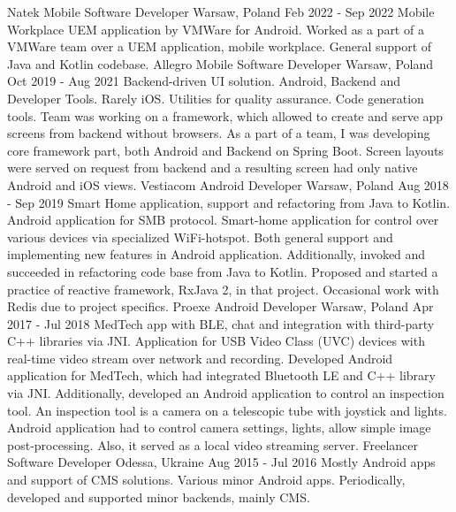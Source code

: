 
\cvexperience
  {Natek}
  {Mobile Software Developer}
  {Warsaw, Poland}
  {Feb 2022 - Sep 2022}
  {
    Mobile Workplace UEM application by VMWare for Android.
  }
  {
    Worked as a part of a VMWare team over a UEM application, mobile workplace. General support of Java and Kotlin codebase.
  }
\cvexperience
  {Allegro}
  {Mobile Software Developer}
  {Warsaw, Poland}
  {Oct 2019 - Aug 2021}
  {
    Backend-driven UI solution. Android, Backend and Developer Tools. Rarely iOS.
    \newline
    Utilities for quality assurance. Code generation tools.
  }
  {
    Team was working on a framework, which allowed to create and serve app screens from backend without browsers.
    \newline
    As a part of a team, I was developing core framework part, both Android and Backend on Spring Boot.
    \newline
    Screen layouts were served on request from backend and a resulting screen had only native Android and iOS views.      
  }
\cvexperience
  {Vestiacom}
  {Android Developer}
  {Warsaw, Poland}
  {Aug 2018 - Sep 2019}
  {
    Smart Home application, support and refactoring from Java to Kotlin.
    \newline
    Android application for SMB protocol.
  }
  {
    Smart-home application for control over various devices via specialized WiFi-hotspot.
    Both general support and implementing new features in Android application.
    Additionally, invoked and succeeded in refactoring code base from Java to Kotlin.
    \newline
    Proposed and started a practice of reactive framework, RxJava 2, in that project.
    Occasional work with Redis due to project specifics.
  }
\cvexperience
  {Proexe}
  {Android Developer}
  {Warsaw, Poland}
  {Apr 2017 - Jul 2018}
  {
    MedTech app with BLE, chat and integration with third-party C++ libraries via JNI.
    \newline
    Application for USB Video Class (UVC) devices with real-time video stream over network and recording.
  }
  {
    Developed Android application for MedTech, which had integrated Bluetooth LE and C++ library via JNI.
    \newline
    Additionally, developed an Android application to control an inspection tool.
    \newline
    An inspection tool is a camera on a telescopic tube with joystick and lights.
    \newline
    Android application had to control camera settings, lights, allow simple image post-processing.
    \newline
    Also, it served as a local video streaming server.
  }
\cvexperience
  {Freelancer}
  {Software Developer}
  {Odessa, Ukraine}
  {Aug 2015 - Jul 2016}
  {
    Mostly Android apps and support of CMS solutions.
  }
  {
    Various minor Android apps.
    \newline
    Periodically, developed and supported minor backends, mainly CMS.
  }

